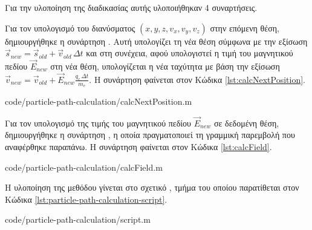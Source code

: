 Για την υλοποίηση της διαδικασίας αυτής υλοποιήθηκαν 4 συναρτήσεις.

Για τον υπολογισμό του διανύσματος $\left(x, y, z, v_x, v_y, v_z\right)$ στην επόμενη θέση, δημιουργήθηκε η συνάρτηση .
Αυτή υπολογίζει τη νέα θέση σύμφωνα με την εξίσωση $\vec{s}_{new} = \vec{s}_{old} + \vec{v}_{old}\, \Delta t$ και στη συνέχεια, αφού υπολογιστεί η τιμή του μαγνητικού πεδίου $\vec{E}_{new}$ στη νέα θέση, υπολογίζεται η νέα ταχύτητα με βάση την εξίσωση $\vec{v}_{new} = \vec{v}_{old} + \vec{E}_{new} \frac{q_e \, \Delta t}{m_e}$.
Η συνάρτηση  φαίνεται στον Κώδικα \ref{lst:calcNextPosition}.


{code/particle-path-calculation/calcNextPosition.m}

Για τον υπολογισμό της τιμής του μαγνητικού πεδίου $\vec{E}_{new}$ σε δεδομένη θέση, δημιουργήθηκε η συνάρτηση  , η οποία πραγματοποιεί τη γραμμική παρεμβολή που αναφέρθηκε παραπάνω. 
Η συνάρτηση  φαίνεται στον Κώδικα \ref{lst:calcField}.


{code/particle-path-calculation/calcField.m}

Η υλοποίηση της μεθόδου γίνεται στο σχετικό , τμήμα του οποίου παρατίθεται στον Κώδικα \ref{lst:particle-path-calculation-script}.



{code/particle-path-calculation/script.m}

%



